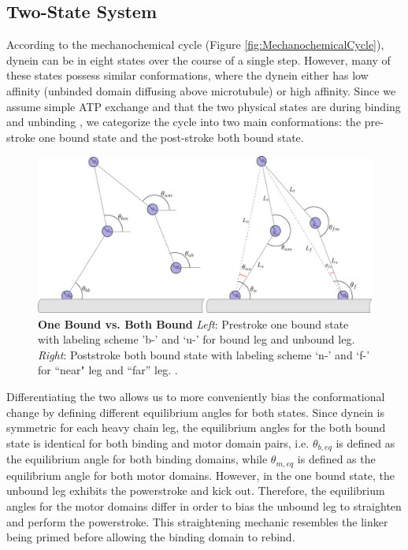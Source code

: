 \subsection{Two-State System}
According to the mechanochemical cycle (Figure \ref{fig:MechanochemicalCycle}), dynein can be in eight states over the course of a single step. However, many of these states possess similar conformations, where the dynein either has low affinity (unbinded domain diffusing above microtubule) or high affinity. Since we assume simple ATP exchange and that the two physical states are during binding and unbinding \cite{}, we categorize the cycle into two main conformations: the pre-stroke one bound state and the post-stroke both bound state.

\begin{figure}[H]
	\centering
	\includegraphics[width=0.9\columnwidth]{Figures/OB_vs_BB.PNG}
	\caption[One Bound vs. Both Bound]{\textbf{One Bound vs. Both Bound} \textit{Left}: Prestroke one bound state with labeling scheme 'b-’ and ‘u-’ for bound leg and unbound leg. \textit{Right}: Poststroke both bound state with labeling scheme ‘n-’ and ‘f-’ for ``near" leg and ``far'' leg. \cite{Capek2017}.}
	\label{fig:OBvsBB}
\end{figure}

Differentiating the two allows us to more conveniently bias the conformational change by defining different equilibrium angles for both states. Since dynein is symmetric for each heavy chain leg, the equilibrium angles for the both bound state is identical for both binding and motor domain pairs, i.e. $\theta_{b,eq}$ is defined as the equilibrium angle for both binding domains, while $\theta_{m,eq}$ is defined as the equilibrium angle for both motor domains. However, in the one bound state, the unbound leg exhibits the powerstroke and kick out. Therefore, the equilibrium angles for the motor domains differ in order to bias the unbound leg to straighten and perform the powerstroke. This straightening mechanic resembles the linker being primed before allowing the binding domain to rebind.


